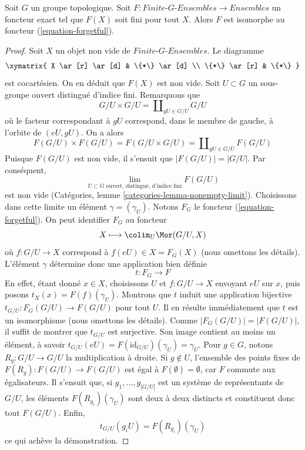 \begin{lemma}
\label{lemma-second-fundamental-functor}
Soit $G$ un groupe topologique. Soit
$F : \textit{Finite-}G\textit{-Ensembles} \to \textit{Ensembles}$
un foncteur exact tel que $F(X)$ soit fini pour tout $X$.
Alors $F$ est isomorphe au foncteur (\ref{equation-forgetful}).
\end{lemma}

\begin{proof}
Soit $X$ un objet non vide de $\textit{Finite-}G\textit{-Ensembles}$. Le diagramme
$$
\xymatrix{
X \ar[r] \ar[d] & \{*\} \ar[d] \\
\{*\} \ar[r] & \{*\}
}
$$
est cocartésien. On en déduit que $F(X)$ est non vide.
Soit $U \subset G$ un sous-groupe ouvert distingué d'indice fini. Remarquons que
$$
G/U \times G/U = \coprod\nolimits_{gU \in G/U} G/U
$$
où le facteur correspondant à $gU$ correspond, dans le membre de gauche, à
l'orbite de $(eU, gU)$. On a alors
$$
F(G/U) \times F(G/U) = F(G/U \times G/U) = \coprod\nolimits_{gU \in G/U} F(G/U)
$$
Puisque $F(G/U)$ est non vide, il s'ensuit que
$|F(G/U)| = |G/U|$. Par conséquent,
$$
\lim_{U \subset G\text{ ouvert, distingué, d'indice fini}} F(G/U)
$$
est non vide (Catégories, lemme \ref{categories-lemma-nonempty-limit}).
Choisissons dans cette limite un élément $\gamma = (\gamma_U)$.
Notons $F_G$ le foncteur (\ref{equation-forgetful}). On peut identifier
$F_G$ au foncteur
$$
X \longmapsto \colim_U \Mor(G/U, X)
$$
où $f : G/U \to X$ correspond à $f(eU) \in X = F_G(X)$
(nous omettons les détails). L'élément $\gamma$ détermine donc une
application bien définie
$$
t : F_G \longrightarrow F
$$
En effet, étant donné $x \in X$, choisissons $U$ et
$f : G/U \to X$ envoyant $eU$ sur $x$, puis posons
$t_X(x) = F(f)(\gamma_U)$. Montrons que $t$ induit une application bijective
$t_{G/U} : F_G(G/U) \to F(G/U)$ pour tout $U$. Il en résulte immédiatement
que $t$ est un isomorphisme (nous omettons les détails).
Comme $|F_G(G/U)| = |F(G/U)|$, il suffit de montrer que $t_{G/U}$ est
surjective. Son image contient au moins un élément, à savoir
$t_{G/U}(eU) = F(\text{id}_{G/U})(\gamma_U) = \gamma_U$.
Pour $g \in G$, notons $R_g : G/U \to G/U$ la multiplication à droite.
Si $g \not \in U$, l'ensemble des points fixes de
$F(R_g) : F(G/U) \to F(G/U)$ est égal à
$F(\emptyset) = \emptyset$, car $F$ commute aux égalisateurs. Il s'ensuit que,
si $g_1, \ldots, g_{|G/U|}$ est un système de représentants de $G/U$, les
éléments $F(R_{g_i})(\gamma_U)$ sont deux à deux distincts et constituent
donc tout $F(G/U)$. Enfin,
$$
t_{G/U}(g_iU) = F(R_{g_i})(\gamma_U)
$$
ce qui achève la démonstration.
\end{proof}

